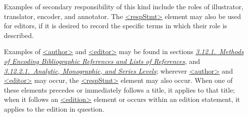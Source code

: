 Examples of secondary responsibility of this kind include the roles of illustrator, translator, encoder, and annotator. The \hyperref[TEI.respStmt]{<respStmt>} element may also be used for editors, if it is desired to record the specific terms in which their role is described.\par
Examples of \hyperref[TEI.author]{<author>} and \hyperref[TEI.editor]{<editor>} may be found in sections \textit{\hyperref[COBITY]{3.12.1.\ Methods of Encoding Bibliographic References and Lists of References}}, and \textit{\hyperref[COBICOL]{3.12.2.1.\ Analytic, Monographic, and Series Levels}}; wherever \hyperref[TEI.author]{<author>} and \hyperref[TEI.editor]{<editor>} may occur, the \hyperref[TEI.respStmt]{<respStmt>} element may also occur. When one of these elements precedes or immediately follows a title, it applies to that title; when it follows an \hyperref[TEI.edition]{<edition>} element or occurs within an edition statement, it applies to the edition in question.\par
